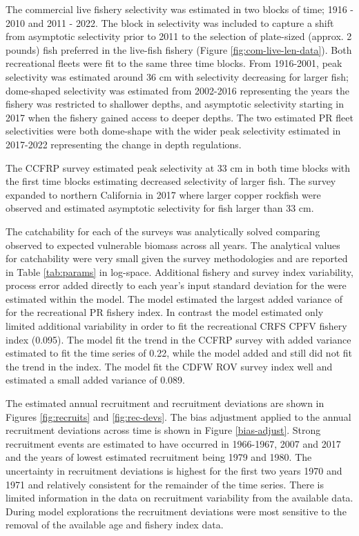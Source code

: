 \documentclass[11pt,
  english,
  letterpaper,
]{article}
\begin{document}
The commercial live fishery selectivity was estimated in two blocks of time; 1916 - 2010 and 2011 - 2022. The block in selectivity was included to capture a shift from asymptotic selectivity prior to 2011 to the selection of plate-sized (approx. 2 pounds) fish preferred in the live-fish fishery (Figure \ref{fig:com-live-len-data}). Both recreational fleets were fit to the same three time blocks. From 1916-2001, peak selectivity was estimated around 36 cm with selectivity decreasing for larger fish; dome-shaped selectivity was estimated from 2002-2016 representing the years the fishery was restricted to shallower depths, and asymptotic selectivity starting in 2017 when the fishery gained access to deeper depths. The two estimated PR fleet selectivities were both dome-shape with the wider peak selectivity estimated in 2017-2022 representing the change in depth regulations.

The CCFRP survey estimated peak selectivity at 33 cm in both time blocks with the first time blocks estimating decreased selectivity of larger fish. The survey expanded to northern California in 2017 where larger copper rockfish were observed and estimated asymptotic selectivity for fish larger than 33 cm.

The catchability for each of the surveys was analytically solved comparing observed to expected vulnerable biomass across all years. The analytical values for catchability were very small given the survey methodologies and are reported in Table \ref{tab:params} in log-space. Additional fishery and survey index variability, process error added directly to each year's input standard deviation for the were estimated within the model. The model estimated the largest added variance of for the recreational PR fishery index. In contrast the model estimated only limited additional variability in order to fit the recreational CRFS CPFV fishery index (0.095). The model fit the trend in the CCFRP survey with added variance estimated to fit the time series of 0.22, while the model added and still did not fit the trend in the index. The model fit the CDFW ROV survey index well and estimated a small added variance of 0.089.

The estimated annual recruitment and recruitment deviations are shown in Figures \ref{fig:recruits} and \ref{fig:rec-devs}. The bias adjustment applied to the annual recruitment deviations across time is shown in Figure \ref{bias-adjust}. Strong recruitment events are estimated to have occurred in 1966-1967, 2007 and 2017 and the years of lowest estimated recruitment being 1979 and 1980. The uncertainty in recruitment deviations is highest for the first two years 1970 and 1971 and relatively consistent for the remainder of the time series. There is limited information in the data on recruitment variability from the available data. During model explorations the recruitment deviations were most sensitive to the removal of the available age and fishery index data.
\end{document}

